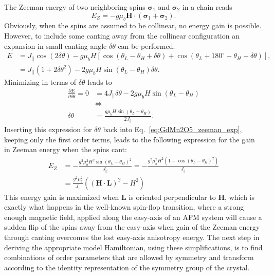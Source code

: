 The Zeeman energy of two neighboring spins $\pmb{\sigma}_1$ and $\pmb{\sigma}_2$ in a chain reads
\begin{equation}
	E_Z = -g \mu_b \mathbf{H} \cdot (\pmb{\sigma}_1 + \pmb{\sigma}_2).
\end{equation}
Obviously, when the spins are assumed to be collinear, no energy gain is possible. However, to include some canting away from the collinear configuration an expansion in small canting angle $\delta \theta$ can be performed.
\begin{align}
	E &= J_{||} \cos(2\delta \theta) - g \mu_b H \left[\cos(\theta_L - \theta_H + \delta \theta) + \cos(\theta_L + 180^\circ - \theta_H - \delta \theta)\right],\nonumber\\
	&= J_{||}\left( 1+2\delta\theta^2 \right) - 2 g \mu_b H \sin(\theta_L - \theta_H)\delta\theta \label{eq:GdMn2O5_zeeman_exp}.
\end{align}
Minimizing in terms of $\delta \theta$ leads to
\begin{align}
	\frac{\partial E}{\partial \delta \theta} = 0 &= 4 J_{||} \delta \theta - 2 g \mu_b H \sin(\theta_L - \theta_H) \nonumber\\
	&\Leftrightarrow \nonumber\\
	\delta \theta &= \frac{g\mu_b H \sin(\theta_L - \theta_H)}{2 J_{||}}.\nonumber
\end{align}
Inserting this expression for $\delta \theta$ back into Eq.~\ref{eq:GdMn2O5_zeeman_exp}, keeping only the first order terms, leads to the following expression for the gain in Zeeman energy when the spins cant:
\begin{align}
	E_Z &= -\frac{g^2\mu_b^2 H^2 \sin(\theta_L - \theta_H)^2}{J_{||}} = -\frac{g^2\mu_b^2 H^2 \left(1 - \cos(\theta_L - \theta_H)^2\right)}{J_{||}} \nonumber\\
	&=\frac{g^2\mu_b^2}{J_{||}}\left((\mathbf{H}\cdot\mathbf{L})^2 - H^2\right)\nonumber
\end{align}
This energy gain is maximized when $\mathbf{L}$ is oriented perpendicular to $\mathbf{H}$, which is exactly what happens in the well-known spin-flop transition, where a strong enough magnetic field, applied along the easy-axis of an AFM system will cause a sudden flip of the spins away from the easy-axis when gain of the Zeeman energy through canting overcomes the lost easy-axis anisotropy energy.
The next step in deriving the appropriate model Hamiltonian, using these simplifications, is to find combinations of order parameters that are allowed by symmetry and transform according to the identity representation of the symmetry group of the crystal.
